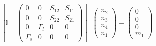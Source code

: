 \[ \left[ \mathbb{I}  - \left(\begin{array}{cccc} 0 & 0 & S_{12} &
S_{11} \\ 0 & 0 & S_{22} & S_{21} \\ 0 & \Gamma_{l} & 0 & 0 \\
\Gamma_{s} & 0 & 0 & 0 \end{array}\right)\right] \cdot
\left(\begin{array}{c} n_{2} \\ n_{3} \\ n_{4} \\ n_{1}
\end{array}\right) = \left(\begin{array}{c} 0 \\ 0 \\ 0 \\ m_{1}
\end{array}\right) \]
